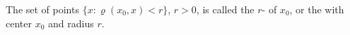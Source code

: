 The set of points $\{x : \varrho(x_0, x) < r\}$, $r > 0$, is called the $r$- of $x_0$, or the  with center $x_0$ and radius $r$.
